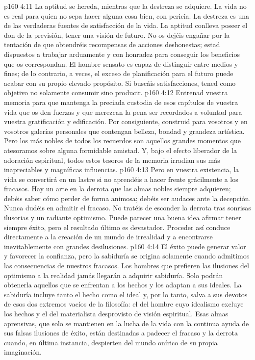 \vs p160 4:11 La aptitud se hereda, mientras que la destreza se adquiere. La vida no es real para quien no sepa hacer alguna cosa bien, con pericia. La destreza es una de las verdaderas fuentes de satisfacción de la vida. La aptitud conlleva poseer el don de la previsión, tener una visión de futuro. No os dejéis engañar por la tentación de que obtendréis recompensas de acciones deshonestas; estad dispuestos a trabajar arduamente y con honradez para conseguir los beneficios que os correspondan. El hombre sensato es capaz de distinguir entre medios y fines; de lo contrario, a veces, el exceso de planificación para el futuro puede acabar con su propio elevado propósito. Si buscáis satisfacciones, tened como objetivo no solamente consumir sino producir.
\vs p160 4:12 Entrenad vuestra memoria para que mantenga la preciada custodia de esos capítulos de vuestra vida que os den fuerzas y que merezcan la pena ser recordados a voluntad para vuestra gratificación y edificación. Por consiguiente, construid para vosotros y en vosotros galerías personales que contengan belleza, bondad y grandeza artística. Pero los más nobles de todos los recuerdos son aquellos grandes momentos que atesoramos sobre alguna formidable amistad. Y, bajo el efecto liberador de la adoración espiritual, todos estos tesoros de la memoria irradian sus más inapreciables y magníficas influencias.
\vs p160 4:13 Pero en vuestra existencia, la vida se convertirá en un lastre si no aprendéis a hacer frente grácilmente a los fracasos. Hay un arte en la derrota que las almas nobles siempre adquieren; debéis saber cómo perder de forma animosa; debéis ser audaces ante la decepción. Nunca dudéis en admitir el fracaso. No tratéis de esconder la derrota tras sonrisas ilusorias y un radiante optimismo. Puede parecer una buena idea afirmar tener siempre éxito, pero el resultado último es devastador. Proceder así conduce directamente a la creación de un mundo de irrealidad y a encontrarse inevitablemente con grandes desilusiones.
\vs p160 4:14 El éxito puede generar valor y favorecer la confianza, pero la sabiduría se origina solamente cuando admitimos las consecuencias de nuestros fracasos. Los hombres que prefieren las ilusiones del optimismo a la realidad jamás llegarán a adquirir sabiduría. Solo podrán obtenerla aquellos que se enfrentan a los hechos y los adaptan a sus ideales. La sabiduría incluye tanto el hecho como el ideal y, por lo tanto, salva a sus devotos de esos dos extremos vacíos de la filosofía: el del hombre cuyo idealismo excluye los hechos y el del materialista desprovisto de visión espiritual. Esas almas aprensivas, que solo se mantienen en la lucha de la vida con la continua ayuda de sus falsas ilusiones de éxito, están destinadas a padecer el fracaso y la derrota cuando, en última instancia, despierten del mundo onírico de su propia imaginación.
